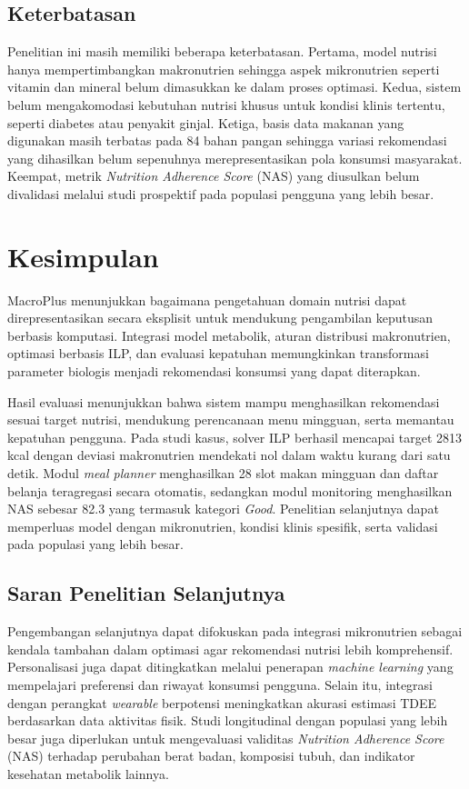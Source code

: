 \documentclass[conference]{IEEEtran}
\begin{document}
\subsection{Keterbatasan}
Penelitian ini masih memiliki beberapa keterbatasan. Pertama, model
nutrisi hanya mempertimbangkan makronutrien sehingga aspek
mikronutrien seperti vitamin dan mineral belum dimasukkan ke dalam
proses optimasi. Kedua, sistem belum mengakomodasi kebutuhan nutrisi
khusus untuk kondisi klinis tertentu, seperti diabetes atau penyakit
ginjal. Ketiga, basis data makanan yang digunakan masih terbatas pada
84 bahan pangan sehingga variasi rekomendasi yang dihasilkan belum
sepenuhnya merepresentasikan pola konsumsi masyarakat. Keempat, metrik
\textit{Nutrition Adherence Score} (NAS) yang diusulkan belum
divalidasi melalui studi prospektif pada populasi pengguna yang lebih
besar.

\section{Kesimpulan}
MacroPlus menunjukkan bagaimana pengetahuan domain nutrisi dapat
direpresentasikan secara eksplisit untuk mendukung pengambilan
keputusan berbasis komputasi. Integrasi model metabolik, aturan
distribusi makronutrien, optimasi berbasis ILP, dan evaluasi
kepatuhan memungkinkan transformasi parameter biologis menjadi
rekomendasi konsumsi yang dapat diterapkan.

Hasil evaluasi menunjukkan bahwa sistem mampu menghasilkan
rekomendasi sesuai target nutrisi, mendukung perencanaan menu mingguan,
serta memantau kepatuhan pengguna. Pada studi kasus, solver ILP
berhasil mencapai target 2813 kcal dengan deviasi makronutrien
mendekati nol dalam waktu kurang dari satu detik. Modul
\textit{meal planner} menghasilkan 28 slot makan mingguan dan daftar
belanja teragregasi secara otomatis, sedangkan modul monitoring
menghasilkan NAS sebesar 82.3 yang termasuk kategori \textit{Good}.
Penelitian selanjutnya dapat memperluas model dengan mikronutrien,
kondisi klinis spesifik, serta validasi pada populasi yang lebih besar.


\subsection*{Saran Penelitian Selanjutnya}
Pengembangan selanjutnya dapat difokuskan pada integrasi mikronutrien
sebagai kendala tambahan dalam optimasi agar rekomendasi nutrisi lebih
komprehensif. Personalisasi juga dapat ditingkatkan melalui penerapan
\textit{machine learning} yang mempelajari preferensi dan riwayat konsumsi pengguna. Selain itu, integrasi dengan perangkat \textit{wearable} berpotensi meningkatkan akurasi estimasi TDEE berdasarkan data aktivitas fisik. Studi longitudinal dengan populasi yang lebih besar juga diperlukan untuk mengevaluasi validitas \textit{Nutrition Adherence Score} (NAS) terhadap perubahan berat badan, komposisi tubuh, dan indikator kesehatan metabolik lainnya.
\end{document}
